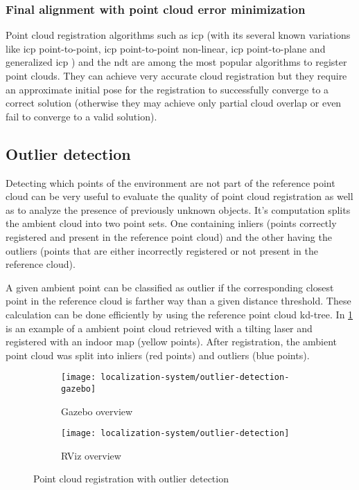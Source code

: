 \subsubsection{Final alignment with point cloud error minimization}

Point cloud registration algorithms such as \gls{icp} \cite{Besl1992} (with its several known variations \cite{Rusinkiewicz2001,Pomerleau2013} like \gls{icp} point-to-point, \gls{icp} point-to-point non-linear, \gls{icp} point-to-plane and generalized \gls{icp} \cite{Segal2009}) and the \gls{ndt} \cite{Magnusson2009} are among the most popular algorithms to register point clouds. They can achieve very accurate cloud registration but they require an approximate initial pose for the registration to successfully converge to a correct solution (otherwise they may achieve only partial cloud overlap or even fail to converge to a valid solution).


\subsection{Outlier detection}

Detecting which points of the environment are not part of the reference point cloud can be very useful to evaluate the quality of point cloud registration as well as to analyze the presence of previously unknown objects. It's computation splits the ambient cloud into two point sets. One containing inliers (points correctly registered and present in the reference point cloud) and the other having the outliers (points that are either incorrectly registered or not present in the reference cloud).

A given ambient point can be classified as outlier if the corresponding closest point in the reference cloud is farther way than a given distance threshold. These calculation can be done efficiently by using the reference point cloud kd-tree. In \cref{fig:localization-system_outlier-detection} is an example of a ambient point cloud retrieved with a tilting laser and registered with an indoor map (yellow points). After registration, the ambient point cloud was split into inliers (red points) and outliers (blue points).


\begin{figure}
	\centering
	\begin{subfigure}[h]{0.45\textwidth}
		\centering
		\texttt{[image: localization-system/outlier-detection-gazebo]}
		\caption{Gazebo overview}
	\end{subfigure}
	\begin{subfigure}[h]{0.45\textwidth}
		\centering
		\texttt{[image: localization-system/outlier-detection]}
		\caption{RViz overview}
	\end{subfigure}\hfill
	\caption{Point cloud registration with outlier detection}
	\label{fig:localization-system_outlier-detection}
\end{figure}


